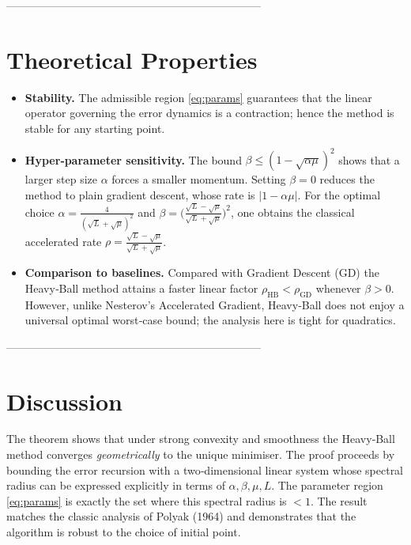 \documentclass[11pt]{article}
\begin{document}
---------------------------------------------------------------------

\section*{Theoretical Properties}
\begin{itemize}
\item \textbf{Stability.} The admissible region \eqref{eq:params} guarantees that the linear operator governing the error dynamics is a contraction; hence the method is stable for any starting point.

\item \textbf{Hyper‑parameter sensitivity.} The bound $\beta\le(1-\sqrt{\alpha\mu})^2$ shows that a larger step size $\alpha$ forces a smaller momentum.  Setting $\beta=0$ reduces the method to plain gradient descent, whose rate is $|1-\alpha\mu|$.  For the optimal choice $\alpha=\frac{4}{(\sqrt{L}+\sqrt{\mu})^2}$ and $\beta=\bigl(\frac{\sqrt{L}-\sqrt{\mu}}{\sqrt{L}+\sqrt{\mu}}\bigr)^2$, one obtains the classical accelerated rate $\rho=\frac{\sqrt{L}-\sqrt{\mu}}{\sqrt{L}+\sqrt{\mu}}$.

\item \textbf{Comparison to baselines.} Compared with Gradient Descent (GD) the Heavy‑Ball method attains a faster linear factor $\rho_{\text{HB}}<\rho_{\text{GD}}$ whenever $\beta>0$.  However, unlike Nesterov’s Accelerated Gradient, Heavy‑Ball does not enjoy a universal optimal worst‑case bound; the analysis here is tight for quadratics.

\end{itemize}

---------------------------------------------------------------------

\section*{Discussion}
The theorem shows that under strong convexity and smoothness the Heavy‑Ball method converges \emph{geometrically} to the unique minimiser.  The proof proceeds by bounding the error recursion with a two‑dimensional linear system whose spectral radius can be expressed explicitly in terms of $\alpha,\beta,\mu,L$.  The parameter region \eqref{eq:params} is exactly the set where this spectral radius is $<1$.  The result matches the classic analysis of Polyak (1964) and demonstrates that the algorithm is robust to the choice of initial point.
\end{document}
